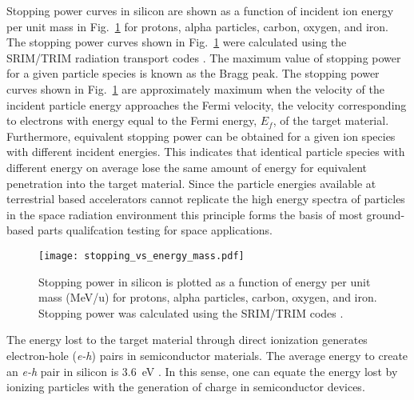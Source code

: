 Stopping power curves in silicon are shown as a function of incident ion energy per unit mass in Fig.~\ref{fig:stopping-power-vs-energy-per-mass} for protons, alpha particles, carbon, oxygen, and iron.
The stopping power curves shown in Fig.~\ref{fig:stopping-power-vs-energy-per-mass} were calculated using the SRIM/TRIM radiation transport codes \cite{ziegler2010srim}.
The maximum value of stopping power for a given particle species is known as the Bragg peak.
The stopping power curves shown in Fig.~\ref{fig:stopping-power-vs-energy-per-mass} are approximately maximum when the velocity of the incident particle energy approaches the Fermi velocity, the velocity corresponding to electrons with energy equal to the Fermi energy, $E_f$, of the target material.
Furthermore, equivalent stopping power can be obtained for a given ion species with different incident energies.
This indicates that identical particle species with different energy on average lose the same amount of energy for equivalent penetration into the target material.
Since the particle energies available at terrestrial based accelerators cannot replicate the high energy spectra of particles in the space radiation environment this principle forms the basis of most ground-based parts qualifcation testing for space applications.
\begin{figure}[tb]
    \begin{center}
        \texttt{[image: stopping\_vs\_energy\_mass.pdf]}
    \end{center}
    \caption[Stopping power in silicon is plotted as a function of energy per unit mass (MeV/u) for protons, alpha particles, carbon, oxygen, and iron. Stopping power was calculated using the SRIM/TRIM codes.]
    {Stopping power in silicon is plotted as a function of energy per unit mass (MeV/u) for protons, alpha particles, carbon, oxygen, and iron. Stopping power was calculated using the SRIM/TRIM codes \cite{ziegler2010srim}.}
    \label{fig:stopping-power-vs-energy-per-mass}
\end{figure}

The energy lost to the target material through direct ionization generates electron-hole (\emph{e-h}) pairs in semiconductor materials. 
The average energy to create an \emph{e-h} pair in silicon is 3.6~eV \cite{pehl1968accurate,ryan1973precision,scholze2000determination}.
In this sense, one can equate the energy lost by ionizing particles with the generation of charge in semiconductor devices.

